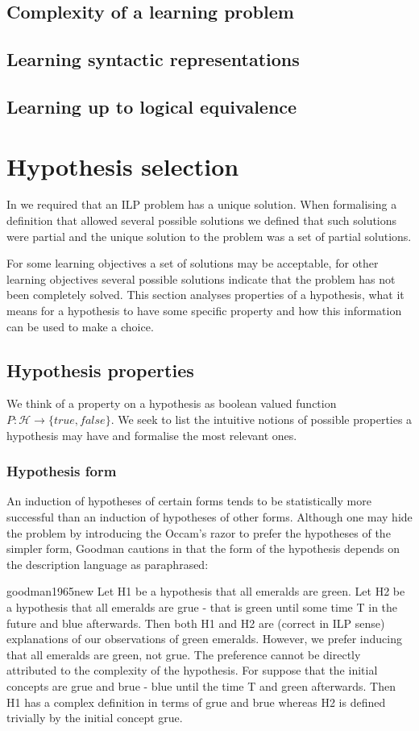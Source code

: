 \subsection{Complexity of a learning problem}
\subsection{Learning syntactic representations}
\subsection{Learning up to logical equivalence}
\section{Hypothesis selection}
In  we required that an ILP problem has a unique solution. When formalising a definition that allowed several possible solutions we defined that such solutions were partial and the unique solution to the problem was a set of partial solutions.

For some learning objectives a set of solutions may be acceptable, for other learning objectives several possible solutions indicate that the problem has not been completely solved. This section analyses properties of a hypothesis, what it means for a hypothesis to have some specific property and how this information can be used to make a choice.

\subsection{Hypothesis properties}
We think of a property on a hypothesis as boolean valued function
$P:\mathcal{H} \to \{true, false\}$. We seek to list the intuitive notions of possible properties a hypothesis may have and formalise the most relevant ones.

\subsubsection{Hypothesis form}
An induction of hypotheses of certain forms tends to be statistically more successful than an induction of hypotheses of other forms.
Although one may hide the problem by introducing the Occam's razor to prefer the hypotheses of the simpler form, Goodman cautions in \cite{goodman1965new} that the form of the hypothesis depends on the description language as paraphrased:

\begin{cite}{goodman1965new}
Let H1 be a hypothesis that all emeralds are green. Let H2 be a hypothesis that all emeralds are grue - that is green until some time T in the future and blue afterwards. Then both H1 and H2 are (correct in ILP sense) explanations of our observations of green emeralds. However, we prefer inducing that all emeralds are green, not grue. The preference cannot be directly attributed to the complexity of the hypothesis. For suppose that the initial concepts are grue and brue - blue until the time T and green afterwards. Then H1 has a complex definition in terms of grue and brue whereas H2 is defined trivially by the initial concept grue.
\end{cite}

